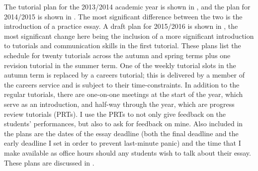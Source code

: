 The tutorial plan for the 2013/2014 academic year is shown in , and the plan for 2014/2015 is shown in . The most significant difference between the two is the introduction of a practice essay. A draft plan for 2015/2016 is shown in , the most significant change here being the inclusion of a more significant introduction to tutorials and communication skills in the first tutorial. These plans list the schedule for twenty tutorials across the autumn and spring terms plus one revision tutorial in the summer term. One of the weekly tutorial slots in the autumn term is replaced by a careers tutorial; this is delivered by a member of the careers service and is subject to their time-constraints. In addition to the regular tutorials, there are one-on-one meetings at the start of the year, which serve as an introduction, and half-way through the year, which are progress review tutorials (PRTs). I use the PRTs to not only give feedback on the students' performances, but also to ask for feedback on mine. Also included in the plans are the dates of the essay deadline (both the final deadline and the early deadline I set in order to prevent last-minute panic) and the time that I make available as office hours should any students wish to talk about their essay. These plans are discussed in .
